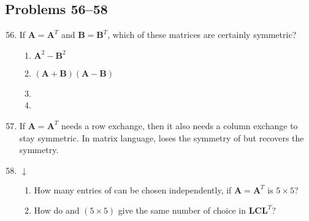 \begin{itemize}
\begin{enumerate}
    \end{enumerate}

    \subsection{Problems 56--58}
    \begin{enumerate}\setcounter{enumi}{55}\color{foreground-2}
      \item If \( \bm{A} = \bm{A}^T \) and \( \bm{B} = \bm{B}^T \), which of
        these matrices are certainly symmetric?
        \begin{enumerate}
          \item \( \bm{A}^2 - \bm{B}^2 \)
          \item \( (\bm{A}+\bm{B})(\bm{A}-\bm{B}) \)
          \item {}
          \item {}
        \end{enumerate}

      \item If \(\bm{A} = \bm{A}^T\) needs a row exchange, then it also needs a
        column exchange to stay symmetric. In matrix language,  loses the
        symmetry of  but  recovers the symmetry.

      \item \( \downarrow \)
         \begin{enumerate}
           \item How many entries of  can be chosen independently, if \(
             \bm{A} = \bm{A}^T \) is \( 5 \times 5 \)?
           \item How do  and  \( (5 \times 5) \) give the same
             number of choice in \( \bm{LCL}^T \)?
        \end{enumerate}

    \end{enumerate}

\end{itemize}
